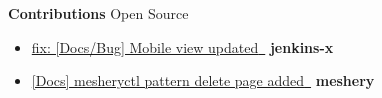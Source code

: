 \documentclass[letterpaper,11pt]{article}
\newcommand{\resumeItem}[2]{
  \item\small{
    \textbf{#1}{#2 \vspace{-6pt}}
  }
}
\newcommand{\resumeSubHeadingListEnd}{\end{itemize}}
\newcommand{\resumeItemListStart}{\begin{itemize}}
\newcommand{\resumeItemListEnd}{\end{itemize}\vspace{-5pt}}
\begin{document}
\textbf{Contributions}{}
\vspace{-7pt}
\hfill
\textbf{}{Open Source}
\resumeItemListStart
\vspace{4pt}
\resumeItem{}{
	\href{https://github.com/jenkins-x/jx-docs/pull/3381}{{fix: [Docs/Bug] Mobile view updated} \,\faExternalLink}
	\hfill
	\textbf{jenkins-x}
}
\resumeItem{}{
	\href{https://github.com/meshery/meshery/pull/3070}{{[Docs] mesheryctl pattern delete page added} \,\faExternalLink}
	\hfill
	\textbf{meshery}
}
\resumeItemListEnd

\end{document}
